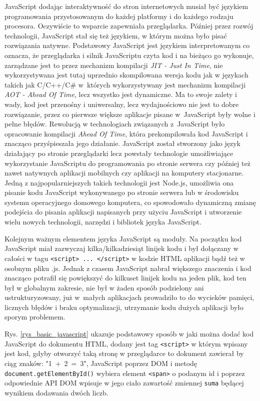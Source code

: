 \documentclass[12pt,a4paper,oneside]{book}
\begin{document}
JavaScript dodając interaktywność do stron internetowych musiał być językiem programowania przystosowanym do każdej platformy i do każdego rodzaju procesora. Oczywiście to wsparcie zapewniała przeglądarka. Później przez rozwój technologii, JavaScript stał się też językiem, w którym można było pisać rozwiązania natywne. Podstawowy JavaScript jest językiem interpretowanym co oznacza, że przeglądarka i silnik JavaScriptu czyta kod i na bieżąco go wykonuje, zarządzane jest to przez mechanizm kompilacji \textit{JIT - Just In Time}, nie wykorzystywana jest tutaj uprzednio skompilowana wersja kodu jak w językach takich jak C/C++/C\# w~których wykorzystywany jest mechanizm kompilacji \textit{AOT - Ahead Of Time}, lecz wszystko jest dynamiczne. Ma to swoje zalety i wady, kod jest przenośny i uniwersalny, lecz wydajnościowo nie jest to dobre rozwiązanie, przez co pierwsze większe aplikacje pisane w~JavaScript były wolne i pełne błędów. Rewolucją w technologiach związanych z~JavaScript było opracowanie kompilacji \textit{Ahead Of Time}, która prekompilowała kod JavaScript i znacząco przyśpieszała jego działanie. JavaScript został stworzony jako język działający po stronie przeglądarki lecz powstały technologie umożliwiające wykorzystanie JavaScriptu do programowania po stronie serwera czy później też nawet natywnych aplikacji mobilnych czy aplikacji na komputery stacjonarne. Jedną z najpopularniejszych takich technologii jest Node.js, umożliwia ona pisanie kodu JavaScript wykonywanego po stronie serwera lub w środowisku systemu operacyjnego domowego komputera, co spowodowało dynamiczną zmianę podejścia do pisania aplikacji napisanych przy użyciu JavaScript i utworzenie wielu nowych technologii, narzędzi i bibliotek języka JavaScript.

Kolejnym ważnym elementem języka JavaScript są moduły. Na początku kod JavaScript miał zazwyczaj kilka/kilkadziesiąt linijek kodu i był dołączany w całości w tagu \texttt{<script> ... </script>} w kodzie HTML aplikacji bądź też w osobnym pliku .js. Jednak z czasem JavaScript nabrał większego znaczenia i kod znacząco potrafił się powiększyć do kilkuset linijek kodu na jeden plik, kod ten był w globalnym zakresie, nie był w żaden sposób podzielony ani ustrukturyzowany, już w~małych aplikacjach prowadziło to do wycieków pamięci, licznych błędów i braku optymalizacji, utrzymanie kodu dużych aplikacji było sporym problemem.

Rys. \ref{rys_basic_javascript} ukazuje podstawowy sposób w jaki można dodać kod JavaScript do dokumentu HTML, dodany jest tag \texttt{<script>} w którym wpisany jest kod, gdyby otworzyć taką stronę w przeglądarce to dokument zawierał by ciąg znaków: "1~+~2~=~3", JavaScript poprzez DOM i metodę \texttt{document.getElementById()} wybiera element \texttt{<span>} o podanym id i poprzez odpowiednie API DOM wpisuje w jego ciało zawartość zmiennej \texttt{suma} będącej wynikiem dodawania dwóch liczb. 
\end{document}
